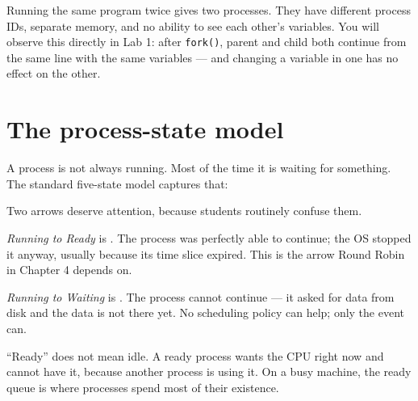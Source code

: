 Running the same program twice gives two processes. They have different process IDs, separate memory, and no ability to see each other's variables. You will observe this directly in Lab 1: after \texttt{fork()}, parent and child both continue from the same line with the same variables --- and changing a variable in one has no effect on the other.

\section{The process-state model}
A process is not always running. Most of the time it is waiting for something. The standard five-state model captures that:

\begin{mlfigure}
\end{mlfigure}

Two arrows deserve attention, because students routinely confuse them.

\emph{Running to Ready} is . The process was perfectly able to continue; the OS stopped it anyway, usually because its time slice expired. This is the arrow Round Robin in Chapter 4 depends on.

\emph{Running to Waiting} is . The process cannot continue --- it asked for data from disk and the data is not there yet. No scheduling policy can help; only the event can.

\begin{pitfall}
``Ready'' does not mean idle. A ready process wants the CPU right now and cannot have it, because another process is using it. On a busy machine, the ready queue is where processes spend most of their existence.
\end{pitfall}

